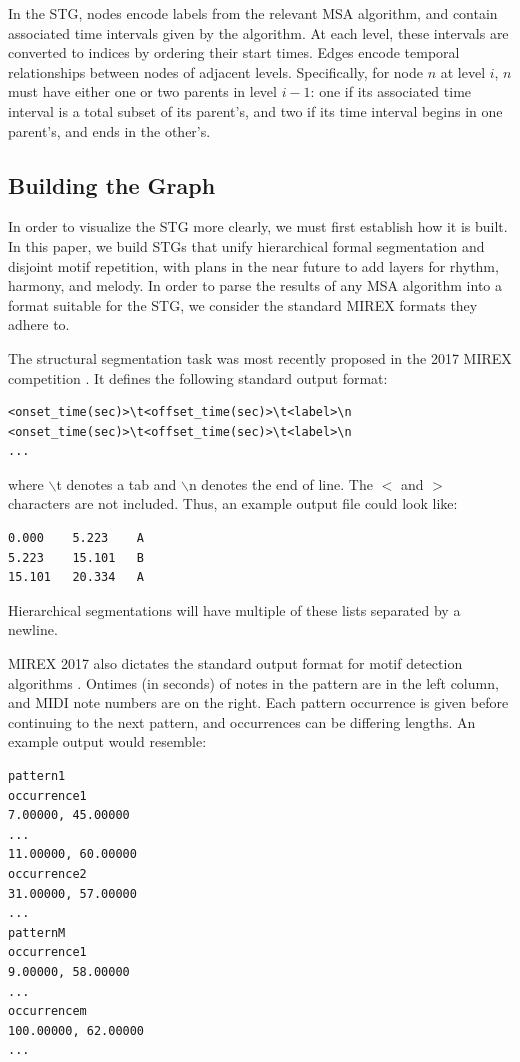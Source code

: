 \documentclass{article}
\begin{document}
In the STG, nodes encode labels from the relevant MSA algorithm, and contain associated time intervals given by the algorithm. At each level, these intervals are converted to indices by ordering their start times. Edges encode temporal relationships between nodes of adjacent levels. Specifically, for node $n$ at level $i$, $n$ must have either one or two parents in level $i-1$: one if its associated time interval is a total subset of its parent's, and two if its time interval begins in one parent's, and ends in the other's.

\subsection{Building the Graph}\label{subsec:build}

In order to visualize the STG more clearly, we must first establish how it is built. In this paper, we build STGs that unify hierarchical formal segmentation and disjoint motif repetition, with plans in the near future to add layers for rhythm, harmony, and melody. In order to parse the results of any MSA algorithm into a format suitable for the STG, we consider the standard MIREX formats they adhere to. 

The structural segmentation task was most recently proposed in the 2017 MIREX competition \cite{MIREX_2017_form}. It defines the following standard output format:
\begin{lstlisting}
<onset_time(sec)>\t<offset_time(sec)>\t<label>\n
<onset_time(sec)>\t<offset_time(sec)>\t<label>\n
...
\end{lstlisting}
where $\backslash$t denotes a tab and $\backslash$n denotes the end of line. The $<$ and $>$ characters are not included. Thus, an example output file could look like:
\begin{lstlisting}
0.000    5.223    A
5.223    15.101   B
15.101   20.334   A
\end{lstlisting}
Hierarchical segmentations will have multiple of these lists separated by a newline.

MIREX 2017 also dictates the standard output format for motif detection algorithms \cite{MIREX_2017_motif}. Ontimes (in seconds) of notes in the pattern are in the left column, and MIDI note numbers are on the right. Each pattern occurrence is given before continuing to the next pattern, and occurrences can be differing lengths. An example output would resemble:
\begin{lstlisting}
pattern1 
occurrence1 
7.00000, 45.00000 
... 
11.00000, 60.00000 
occurrence2 
31.00000, 57.00000 
...
patternM 
occurrence1 
9.00000, 58.00000 
...
occurrencem 
100.00000, 62.00000 
...
\end{lstlisting}
\end{document}
